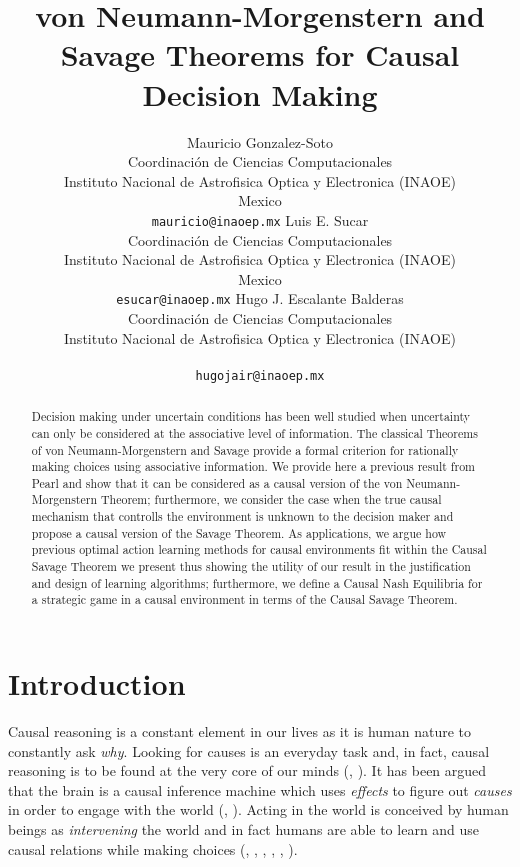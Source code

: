 \documentclass{article}
\title{von Neumann-Morgenstern and Savage Theorems for Causal Decision Making}
\author{
  Mauricio Gonzalez-Soto \\
  Coordinación de Ciencias Computacionales\\
  Instituto Nacional de Astrofisica Optica y Electronica (INAOE)\\
  Mexico \\
  \texttt{mauricio@inaoep.mx}
   \And
   Luis E. Sucar\\
   Coordinación de Ciencias Computacionales \\
   Instituto Nacional de Astrofisica Optica y Electronica (INAOE) \\
   Mexico\\
   \texttt{esucar@inaoep.mx}
   \And
  Hugo J. Escalante Balderas \\
  Coordinación de Ciencias Computacionales \\
  Instituto Nacional de Astrofisica Optica y Electronica (INAOE) \\ \\
   \texttt{hugojair@inaoep.mx}
}
\theoremstyle{plain}
\begin{document}
\maketitle

\begin{abstract}
Decision making under uncertain conditions has been well studied when uncertainty can only be considered at the associative level of information. The classical Theorems of von Neumann-Morgenstern and Savage provide a formal criterion for rationally making choices using associative information. We provide here a previous result from Pearl and show that it can be considered as a causal version of the von Neumann-Morgenstern Theorem; furthermore, we consider the case when the true causal mechanism that controlls the environment is unknown to the decision maker and propose a causal version of the Savage Theorem. As applications, we argue how previous optimal action learning methods for causal environments fit within the Causal Savage Theorem we present thus showing the utility of our result in the justification and design of learning algorithms; furthermore, we define a Causal Nash Equilibria for a strategic game in a causal environment in terms of the Causal Savage Theorem.
\end{abstract}
\section{Introduction}
Causal reasoning is a constant element in our lives as it is human nature to constantly ask \textit{why}. Looking for causes is an everyday task and, in fact, causal reasoning is to be found at the very core of our minds (\cite{waldmann2013causal}, \cite{danks2014unifying}). It has been argued that the brain is a causal inference machine which uses \textit{effects} to figure out \textit{causes} in order to engage with the world (\cite{friston2010free}, \cite{clark2015surfing}). Acting in the world is conceived by human beings as \textit{intervening} the world and in fact humans are able to learn and use causal relations while making choices (\cite{tversky1980causal}, \cite{Garcia-Retamero2006}, \cite{hagmayer2008causal}, \cite{hagmayer2009decision}, \cite{hagmayer2013repeated}, \cite{hagmayer2017causality}).
\end{document}
